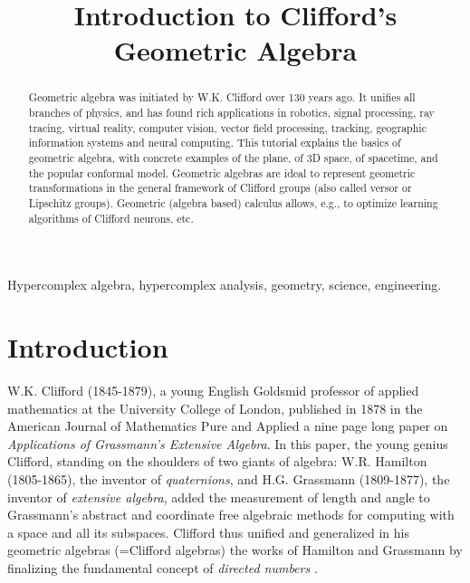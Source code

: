 \documentclass[cameraready]{jcmsi}%
\title{Introduction to Clifford's Geometric Algebra}
\begin{document}



\begin{abstract}%
Geometric algebra was initiated by W.K. Clifford over 130 years ago. It unifies all branches of physics, and has found rich applications in robotics, signal processing, ray tracing, virtual reality, computer vision, vector field processing, tracking, geographic information systems and neural computing. This tutorial explains the basics of geometric algebra, with concrete examples of the plane, of 3D space, of spacetime, and the popular conformal model. Geometric algebras are ideal to represent geometric transformations in the general framework of Clifford groups (also called versor or Lipschitz groups). Geometric (algebra based) calculus allows, e.g., to optimize learning algorithms of Clifford neurons, etc. 
\end{abstract}

\begin{keywords}%
Hypercomplex algebra, hypercomplex analysis, geometry, science, engineering.
\end{keywords}


\maketitle


\section{Introduction}

W.K. Clifford (1845-1879), a young English Goldsmid professor of applied mathematics at the University College of London, published in 1878 in the American Journal of Mathematics Pure and Applied a nine page long paper on \textit{Applications of Grassmann's Extensive Algebra}. In this paper, the young genius Clifford, standing on the shoulders of two giants of algebra: W.R. Hamilton (1805-1865), the inventor of \textit{quaternions}, and H.G. Grassmann (1809-1877), the inventor of \textit{extensive algebra}, added the measurement of length and angle to Grassmann's abstract and coordinate free algebraic methods for computing with a space and all its subspaces. Clifford thus unified and generalized in his geometric algebras (=Clifford algebras) the works of Hamilton and Grassmann by finalizing the fundamental concept of \textit{directed numbers} \cite{GS:CMinGA}.
\end{document}
